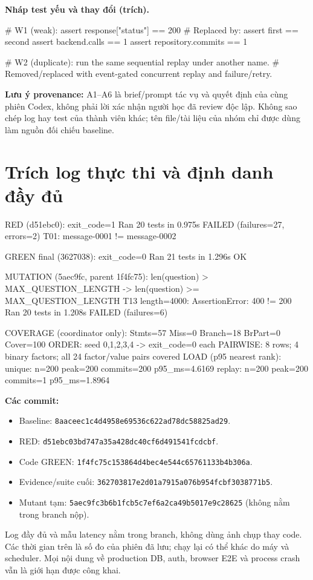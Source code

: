 \documentclass[11pt,a4paper]{article}
\DeclareRobustCommand{\code}[1]{\nolinkurl{#1}}
\begin{document}
\textbf{Nháp test yếu và thay đổi (trích).}
\begin{Code}
# W1 (weak): assert response["status"] == 200
# Replaced by:
assert first == second
assert backend.calls == 1
assert repository.commits == 1

# W2 (duplicate): run the same sequential replay under another name.
# Removed/replaced with event-gated concurrent replay and failure/retry.
\end{Code}
\textbf{Lưu ý provenance:} A1--A6 là brief/prompt tác vụ và quyết định của cùng phiên Codex, không phải lời xác nhận người học đã review độc lập. Không sao chép log hay test của thành viên khác; tên file/tài liệu của nhóm chỉ được dùng làm nguồn đối chiếu baseline.

\clearpage
\section{Trích log thực thi và định danh đầy đủ}
\begin{Code}
RED (d51ebc0):
  exit_code=1
  Ran 20 tests in 0.975s
  FAILED (failures=27, errors=2)
  T01: message-0001 != message-0002

GREEN final (3627038):
  exit_code=0
  Ran 21 tests in 1.296s
  OK

MUTATION (5aec9fc, parent 1f4fc75):
  len(question) > MAX_QUESTION_LENGTH
    -> len(question) >= MAX_QUESTION_LENGTH
  T13 length=4000: AssertionError: 400 != 200
  Ran 20 tests in 1.208s
  FAILED (failures=6)

COVERAGE (coordinator only):
  Stmts=57 Miss=0 Branch=18 BrPart=0 Cover=100%
ORDER:
  seed 0,1,2,3,4 -> exit_code=0 each
PAIRWISE:
  8 rows; 4 binary factors; all 24 factor/value pairs covered
LOAD (p95 nearest rank):
  unique: n=200 peak=200 commits=200 p95_ms=4.6169
  replay: n=200 peak=200 commits=1   p95_ms=1.8964
\end{Code}

\textbf{Các commit:}
\begin{itemize}
\item Baseline: \code{8aaceec1c4d4958e69536c622ad78dc58825ad29}.
\item RED: \code{d51ebc03bd747a35a428dc40cf6d491541fcdcbf}.
\item Code GREEN: \code{1f4fc75c153864d4bec4e544c65761133b4b306a}.
\item Evidence/suite cuối: \code{362703817e2d01a7915a076b954fcbf3038771b5}.
\item Mutant tạm: \code{5aec9fc3b6b1fcb5c7ef6a2ca49b5017e9c28625} (không nằm trong branch nộp).
\end{itemize}
Log đầy đủ và mẫu latency nằm trong branch, không dùng ảnh chụp thay code. Các thời gian trên là số đo của phiên đã lưu; chạy lại có thể khác do máy và scheduler. Mọi nội dung về production DB, auth, browser E2E và process crash vẫn là giới hạn được công khai.
\end{document}
